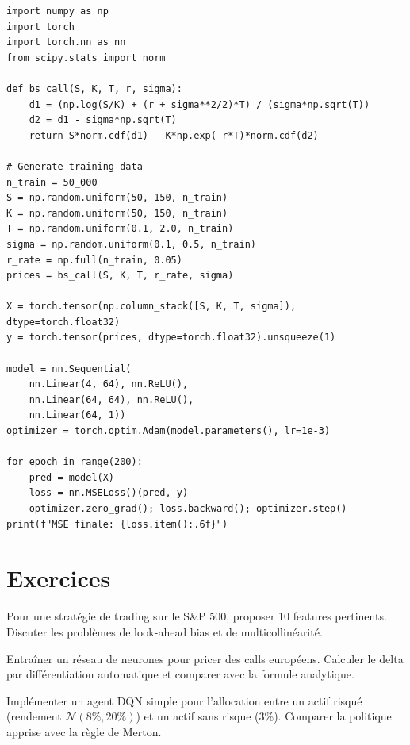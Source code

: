 \begin{codeblock}[title=\textbf{Pricing d'options par r\'eseau de neurones}]
\begin{verbatim}
import numpy as np
import torch
import torch.nn as nn
from scipy.stats import norm

def bs_call(S, K, T, r, sigma):
    d1 = (np.log(S/K) + (r + sigma**2/2)*T) / (sigma*np.sqrt(T))
    d2 = d1 - sigma*np.sqrt(T)
    return S*norm.cdf(d1) - K*np.exp(-r*T)*norm.cdf(d2)

# Generate training data
n_train = 50_000
S = np.random.uniform(50, 150, n_train)
K = np.random.uniform(50, 150, n_train)
T = np.random.uniform(0.1, 2.0, n_train)
sigma = np.random.uniform(0.1, 0.5, n_train)
r_rate = np.full(n_train, 0.05)
prices = bs_call(S, K, T, r_rate, sigma)

X = torch.tensor(np.column_stack([S, K, T, sigma]), dtype=torch.float32)
y = torch.tensor(prices, dtype=torch.float32).unsqueeze(1)

model = nn.Sequential(
    nn.Linear(4, 64), nn.ReLU(),
    nn.Linear(64, 64), nn.ReLU(),
    nn.Linear(64, 1))
optimizer = torch.optim.Adam(model.parameters(), lr=1e-3)

for epoch in range(200):
    pred = model(X)
    loss = nn.MSELoss()(pred, y)
    optimizer.zero_grad(); loss.backward(); optimizer.step()
print(f"MSE finale: {loss.item():.6f}")
\end{verbatim}
\end{codeblock}

\section{Exercices}

\begin{exercice}
Pour une strat\'egie de trading sur le S\&P 500, proposer 10 features
pertinents. Discuter les probl\`emes de look-ahead bias et de
multicollin\'earit\'e.
\end{exercice}

\begin{exercice}
Entra\^iner un r\'eseau de neurones pour pricer des calls europ\'eens. Calculer
le delta par diff\'erentiation automatique et comparer avec la formule
analytique.
\end{exercice}

\begin{exercice}
Impl\'ementer un agent DQN simple pour l'allocation entre un actif risqu\'e
(rendement $\mathcal{N}(8\%, 20\%)$) et un actif sans risque (3\%). Comparer
la politique apprise avec la r\`egle de Merton.
\end{exercice}


